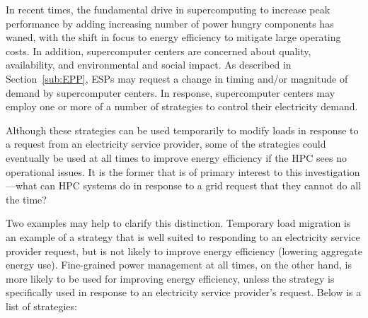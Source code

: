 In recent times, the fundamental drive in supercomputing to increase peak performance by adding 
increasing number of power hungry components has waned, with the shift in focus to energy 
efficiency to mitigate large operating costs.
In addition, supercomputer centers are concerned about quality, availability, and 
environmental and social impact.
As described in Section~\ref{sub:EPP}, ESPs may request 
a change in timing and/or magnitude of demand by supercomputer centers.  
In response, supercomputer centers may employ one or more of a number of strategies to control their 
electricity demand.

Although these strategies can be used temporarily to modify loads in response to a request from an 
electricity service provider, some of the strategies could eventually be used at all times to improve energy 
efficiency if the HPC sees no operational issues. It is the former that is of primary interest to this 
investigation---what can HPC systems do in response to a grid request that they cannot do all the time? 

Two examples may help to clarify this distinction. Temporary load migration is an example of a strategy 
that is well suited to responding to an electricity service provider request, but is not likely to improve 
energy efficiency (lowering aggregate energy use). Fine-grained power management at all times, on 
the other hand, is more likely to be used for improving energy efficiency, unless the strategy is 
specifically used in response to an electricity service provider's request. 
Below is a list of strategies:

